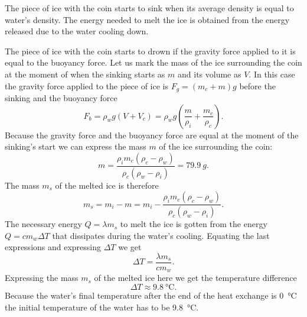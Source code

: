 {\ifEngHint
The piece of ice with the coin starts to sink when its average density is equal to water’s density. The energy needed to melt the ice is obtained from the energy released due to the water cooling down.
\fi


\ifEngSolution
The piece of ice with the coin starts to drown if the gravity force applied to it is equal to the buoyancy force. Let us mark the mass of the ice surrounding the coin at the moment of when the sinking starts as $m$ and its volume as $V$. In this case the gravity force applied to the piece of ice is $F_g=(m_c+m)g$ before the sinking and the buoyancy force 
\[ F_b=\rho_w g(V + V_c)=\rho_w g\left(\frac{m}{\rho_i} + \frac{m_c}{\rho_c}\right). \]
Because the gravity force and the buoyancy force are equal at the moment of the sinking's start we can express the mass $m$ of the ice surrounding the coin:
\[ m = \frac{\rho_i m_c(\rho_c - \rho_w)}{\rho_c(\rho_w - \rho_i)} = \SI{79,9}{g}. \] 
The mass $m_s$ of the melted ice is therefore
\[ m_s = m_i - m = m_i - \frac{\rho_i m_c(\rho_c - \rho_w)}{\rho_c(\rho_w - \rho_i)}. \]
The necessary energy $Q=\lambda m_s$ to melt the ice is gotten from the energy $Q=cm_w\Delta T$ that dissipates during the water's cooling. Equating the last expressions and expressing $\Delta T$ we get 
\[ \Delta  T = \frac{\lambda m_s}{cm_w}. \] 
Expressing the mass $m_s$ of the melted ice here we get the temperature difference
\[ \Delta T \approx \SI{9,8}{\celsius}. \] 
Because the water's final temperature after the end of the heat exchange is \SI{0}{\celsius} the initial temperature of the water has to be \SI{9,8}{\celsius}.
\fi
}